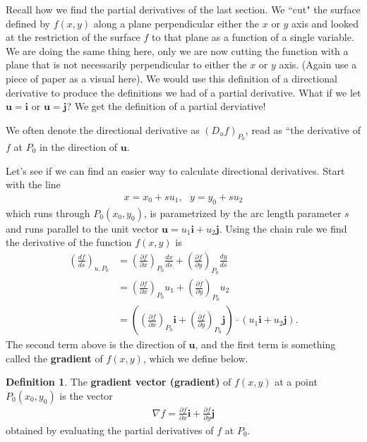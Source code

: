 \documentclass[12pt, letter]{article}
\theoremstyle{plain}
\numberwithin{theorem}{section}
\theoremstyle{definition}
\newtheorem{definition}[theorem]{Definition}
\begin{document}
\bigskip

Recall how we find the partial derivatives of the last section. We ``cut" the surface defined by $f(x,y)$ along a plane perpendicular either the $x$ or $y$ axis and looked at the restriction of the surface $f$ to that plane as a function of a single variable. We are doing the same thing here, only we are now cutting the function with a plane that is not necessarily perpendicular to either the $x$ or $y$ axis. (Again use a piece of paper as a visual here). We would use this definition of a directional derivative to produce the definitions we had of a partial derivative. What if we let $\bm{u} = \bm{i}$ or $\bm{u} = \bm{j}$? We get the definition of a partial derviative!

\bigskip

We often denote the directional derivative as $(D_u f)_{P_0}$, read as ``the derivative of $f$ at $P_0$ in the direction of $\bm{u}$.

\bigskip

\hrulefill

\bigskip

Let's see if we can find an easier way to calculate directional derivatives. Start with the line
\begin{align*}
x= x_0+su_1, \ \ \ y= y_0 + su_2
\end{align*}
which runs through $P_0(x_0,y_0)$, is parametrized by the arc length parameter $s$ and runs parallel to the unit vector $\bm{u} = u_1 \bm{i} + u_2 \bm{j}$. Using the chain rule we find the derivative of the function $f(x,y)$ is
\begin{align*}
\left( \frac{df}{ds} \right)_{u,P_0} &= \left(\frac{\partial f}{\partial x} \right)_{P_0} \frac{dx}{ds} + \left(\frac{\partial f}{\partial y} \right)_{P_0} \frac{dy}{ds}\\
&= \left(\frac{\partial f}{\partial x} \right)_{P_0} u_1 + \left(\frac{\partial f}{\partial y} \right)_{P_0} u_2\\
&= \left( \left(\frac{\partial f}{\partial x}\right)_{P_0} \bm{i} + \left(\frac{\partial f}{\partial y} \right)_{P_0} \bm{j} \right) \cdot \left(u_1\bm{i} + u_2 \bm{j}\right).
\end{align*}
The second term above is the direction of $\bm{u}$, and the first term is something called the \textbf{gradient} of $f(x,y)$, which we define below.

\bigskip

\begin{definition}
The \textbf{gradient vector (gradient)} of $f(x,y)$ at a point $P_0(x_0,y_0)$ is the vector
\begin{align*}
\nabla f = \frac{\partial f}{\partial x} \bm{i} + \frac{\partial f}{\partial y} \bm{j}
\end{align*}
obtained by evaluating the partial derivatives of $f$ at $P_0$.
\end{definition}
\end{document}
